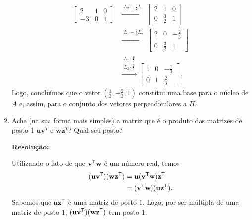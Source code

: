\documentclass[leqno]{article}
\numberwithin{equation}{section}
\newcommand{\bfw}{\mathbf{w}}
\newcommand{\bfv}{\mathbf{v}}
\newcommand{\bfu}{\mathbf{u}}
\newcommand{\bfz}{\mathbf{z}}
\newenvironment{sol}
{
    \vspace{4mm}
    \noindent\textbf{Resolução:}
    \strut\newline
    \smallskip
    \hspace{-3.5mm}
}
{}
\begin{document}
\begin{enumerate}
\begin{align*}
\begin{bmatrix}
                                     2 & 1 & 0 \\
                                     -3 & 0 & 1
                                 \end{bmatrix}
            &\xrightarrow{
                \begin{array}{l}
                    L_{ 2 } + \frac{ 3 }{ 2 } L_{ 1 }
                \end{array}
            }
            \begin{bmatrix}
                2 & 1 & 0 \\
                0 & \frac{ 3 }{ 2 } & 1
            \end{bmatrix} \\
            &\xrightarrow{
                \begin{array}{l}
                    L_{ 1 } - \frac{ 2 }{ 3 } L_{ 2 }
                \end{array}
            }
            \begin{bmatrix}
                2 & 0 & - \frac{ 2 }{ 3 } \\
                0 & \frac{ 3 }{ 2 } & 1
            \end{bmatrix} \\
            &\xrightarrow{
                \begin{array}{l}
                    L_{ 1 } \cdot \frac{ 1 }{ 2 } \\
                    L_{ 2 } \cdot \frac{ 2 }{ 3 }
                \end{array}
            }
            \begin{bmatrix}
                1 & 0 & - \frac{ 1 }{ 3 } \\
                0 & 1 & \frac{ 2 }{ 3 }
            \end{bmatrix}
        .\end{align*}
        Logo, concluímos que o vetor \( ( \frac{ 1 }{ 3 }, - \frac{ 2 }{ 3 }, 1 ) \) constitui uma base para o núcleo de \( A \) e, assim, para o conjunto dos vetores perpendiculares a \( \Pi \).

    \item Ache (na sua forma mais simples) a matriz que é o produto das matrizes de posto 1 $\bfu \bfv^T$ e $\bfw \bfz^T$? Qual seu posto?

        \begin{sol} 
            Utilizando o fato de que \( \bfv^{ \transpose } \bfw \) é um número real, temos
            \begin{align*}
                ( \bfu \bfv^{ \transpose } ) ( \bfw \bfz^{ \transpose } )
                &= \bfu ( \bfv^{ \transpose } \bfw ) \bfz^{ \transpose } \\
                &= ( \bfv^{ \transpose } \bfw ) ( \bfu \bfz^{ \transpose } )
            .\end{align*}
            Sabemos que \( \bfu \bfz^{ \transpose } \) é uma matriz de posto \( 1 \).
            Logo, por ser múltipla de uma matriz de posto \( 1 \), \( ( \bfu \bfv^{ \transpose } ) ( \bfw \bfz^{ \transpose } ) \) tem posto \( 1 \).
        \end{sol} 


\end{enumerate}
\end{document}
